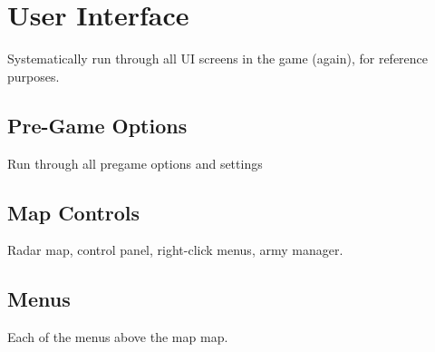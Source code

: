\chapter{User Interface}
Systematically run through all UI screens in the game (again), for reference purposes. 

\section{Pre-Game Options}
Run through all pregame options and settings

\section{Map Controls}
Radar map, control panel, right-click menus, army manager.

\section{Menus}
Each of the menus above the map map.

